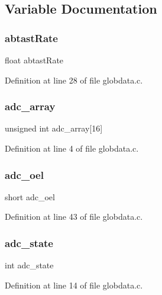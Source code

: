 \subsection{Variable Documentation}
\mbox{\label{globdata_8c_add5c5c9cbf8e60eecea9081015cd6a80}} 
\subsubsection{abtast\+Rate}
{\footnotesize\ttfamily float abtast\+Rate}



Definition at line 28 of file globdata.\+c.

\mbox{\label{globdata_8c_a3fe0576ac18faf17e1b5b05f1ea4a210}} 
\subsubsection{adc\+\_\+array}
{\footnotesize\ttfamily unsigned int adc\+\_\+array[16]}



Definition at line 4 of file globdata.\+c.

\mbox{\label{globdata_8c_ae3a819c589b7aa0f5ba6f78fa2776265}} 
\subsubsection{adc\+\_\+oel}
{\footnotesize\ttfamily short adc\+\_\+oel}



Definition at line 43 of file globdata.\+c.

\mbox{\label{globdata_8c_aafaf88f68ddff75e79b9993eb9613469}} 
\subsubsection{adc\+\_\+state}
{\footnotesize\ttfamily int adc\+\_\+state}



Definition at line 14 of file globdata.\+c.

\mbox{\label{globdata_8c_aa186a8fc885ad7481aebc685635bf12e}} 
